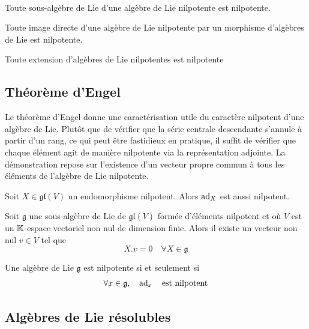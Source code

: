 \omitted

\begin{proposition}
    ~\begin{ilist}
        \item Toute sous-algèbre de Lie d'une algèbre de Lie nilpotente est nilpotente.
        \item Toute image directe d'une algèbre de Lie nilpotente par un morphisme d'algèbres de Lie est nilpotente.
        \item Toute extension d'algèbres de Lie nilpotentes est nilpotente
    \end{ilist}
\end{proposition}

\omitted

\subsection{Théorème d'Engel}

Le théorème d'Engel donne une caractérisation utile du caractère nilpotent d'une algèbre de Lie. Plutôt que de vérifier que la série centrale descendante s'annule à partir d'un rang, ce qui peut être fastidieux en pratique, il suffit de vérifier que chaque élément agit de manière nilpotente via la représentation adjointe. La démonstration repose sur l'existence d'un vecteur propre commun à tous les éléments de l'algèbre de Lie nilpotente.

\begin{lemma}
    Soit $X\in \mathfrak{gl}(V)$ un endomorphisme nilpotent. Alors $\operatorname{ad}_X$ est aussi nilpotent.
\end{lemma}

\omitted

\begin{lemma}
    Soit $\mathfrak{g}$ une sous-algèbre de Lie de $\mathfrak{gl}(V)$ formée d'éléments nilpotent et où $V$ est un $\mathbb{K}$-espace vectoriel non nul de dimension finie. Alors il existe un vecteur non nul $v\in V$ tel que 
    $$X.v = 0 \quad \forall X \in \mathfrak{g}$$
\end{lemma}

\omitted

\begin{theorem}
    Une algèbre de Lie $\mathfrak{g}$ est nilpotente si et seulement si 
    $$\forall x\in \mathfrak{g}, \quad \operatorname{ad}_x \quad \text{est nilpotent}$$ 
\end{theorem}

\omitted

\subsection{Algèbres de Lie résolubles}


